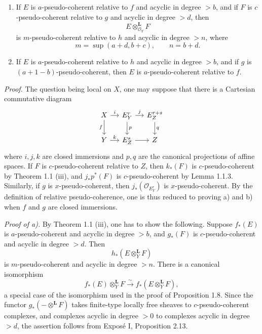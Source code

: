 \documentclass[11pt]{article}
\begin{document}
\begin{enumerate}[label=\alph*)]
\item If \(E\) is \(a\)-pseudo-coherent relative to \(f\) and acyclic in degree \(>b\), and if \(F\) is \(c\)-pseudo-coherent relative to \(g\) and acyclic in degree \(>d\), then
\[
  E\otimes_{\mathcal O_Y}^{\mathbf L}F
\]
is \(m\)-pseudo-coherent relative to \(h\) and acyclic in degree \(>n\), where
\[
  m=\sup(a+d,b+c),\qquad n=b+d.
\]

\item If \(E\) is \(a\)-pseudo-coherent relative to \(h\) and acyclic in degree \(>b\), and if \(g\) is \((a+1-b)\)-pseudo-coherent, then \(E\) is \(a\)-pseudo-coherent relative to \(f\).
\end{enumerate}

\emph{Proof.} The question being local on \(X\), one may suppose that there is a Cartesian commutative diagram
\[
\begin{tikzcd}[column sep=small]
X \arrow[r,"i"] \arrow[d,"f"'] & E^r_Y \arrow[r,"j"] \arrow[d,"p"] & E^{r+s}_Z \arrow[d,"q"]\\
Y \arrow[r,"k"] & E^s_Z \arrow[r] & Z
\end{tikzcd}
\]
where \(i,j,k\) are closed immersions and \(p,q\) are the canonical projections of affine spaces. If \(F\) is \(c\)-pseudo-coherent relative to \(Z\), then \(k_*(F)\) is \(c\)-pseudo-coherent by Theorem 1.1 (iii), and \(j_*p^*(F)\) is \(c\)-pseudo-coherent by Lemma 1.1.3. Similarly, if \(g\) is \(x\)-pseudo-coherent, then \(j_*(\mathcal O_{E^r_Y})\) is \(x\)-pseudo-coherent. By the definition of relative pseudo-coherence, one is thus reduced to proving a) and b) when \(f\) and \(g\) are closed immersions.

\emph{Proof of a).} By Theorem 1.1 (iii), one has to show the following. Suppose \(f_*(E)\) is \(a\)-pseudo-coherent and acyclic in degree \(>b\), and \(g_*(F)\) is \(c\)-pseudo-coherent and acyclic in degree \(>d\). Then
\[
  h_*(E\otimes_Y^{\mathbf L}F)
\]
is \(m\)-pseudo-coherent and acyclic in degree \(>n\). There is a canonical isomorphism
\[
  f_*(E)\otimes_Y^{\mathbf L}F\xrightarrow{\sim} f_*(E\otimes_Y^{\mathbf L}F),
\]
a special case of the isomorphism used in the proof of Proposition 1.8. Since the functor \(g_*(-\otimes^{\mathbf L}F)\) takes finite-type locally free sheaves to \(c\)-pseudo-coherent complexes, and complexes acyclic in degree \(>0\) to complexes acyclic in degree \(>d\), the assertion follows from Exposé I, Proposition 2.13.
\end{document}
